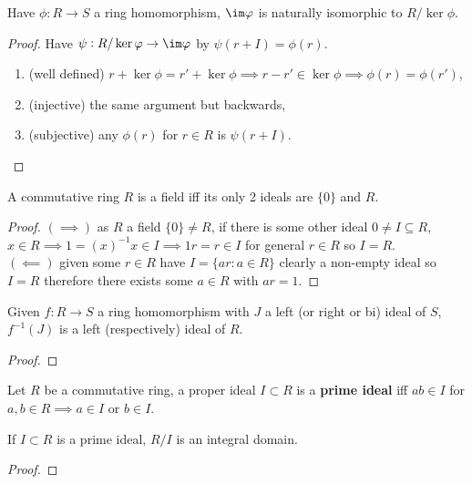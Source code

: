 \documentclass{report}
\begin{document}
\begin{theorem}\label{iso}
    Have $\phi:R\rightarrow S$ a ring homomorphism, $\im\phi$ is naturally isomorphic to $R/\ker\phi$.
    \begin{proof}
        Have $\psi:R/\ker\phi\rightarrow\im\phi$ by $\psi(r+I)=\phi(r)$. \begin{enumerate}
            \item[](well defined) $r+\ker\phi=r'+\ker\phi\implies r-r'\in\ker\phi\implies\phi(r)=\phi(r')$,
            \item[](injective) the same argument but backwards,
            \item[](subjective) any $\phi(r)$ for $r\in R$ is $\psi(r+I)$.\vspace{-20pt}
        \end{enumerate}
    \end{proof}
\end{theorem}

\begin{proposition}
    A commutative ring $R$ is a field iff its only 2 ideals are $\{0\}$ and $R$.\begin{proof}
        $(\implies)$ as $R$ a field $\{0\}\neq R$, if there is some other ideal $0\neq I\subseteq R$, $x\in R\implies 1={(x)}^{-1}x\in I \implies 1r = r \in I$ for general $r\in R$ so $I=R$. \\
        $(\impliedby)$ given some $r\in R$ have $I=\{ar:a\in R\}$ clearly a non-empty ideal so $I=R$ therefore there exists some $a\in R$ with $ar=1$.
    \end{proof}
\end{proposition}

\begin{proposition}
    Given $f:R\rightarrow S$ a ring homomorphism with $J$ a left (or right or bi) ideal of $S$, $f^{-1}(J)$ is a left (respectively) ideal of $R$.
    \begin{proof}
        
    \end{proof}
\end{proposition}

\begin{definition}
    Let $R$ be a commutative ring, a proper ideal $I\subset R$ is a \textbf{prime ideal} iff $ab\in I$ for $a,b\in R \implies a\in I$ or $b\in I$.
\end{definition}

\begin{proposition}
    If $I\subset R$ is a prime ideal, $R/I$ is an integral domain.
    \begin{proof}
        
    \end{proof}
\end{proposition}
\end{document}
